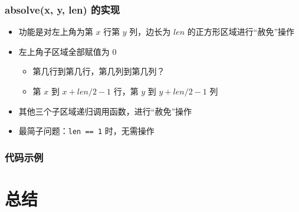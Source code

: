 \begin{frame}[fragile]
    \frametitle{absolve(x, y, len) 的实现}
    \begin{itemize}[<+->]
        \item 功能是对左上角为第 $x$ 行第 $y$ 列，边长为 $len$ 的正方形区域进行“赦免”操作
        \item 左上角子区域全部赋值为 $0$
        \begin{itemize}
            \item 第几行到第几行，第几列到第几列？
            \item 第 $x$ 到 $x + len / 2 - 1$ 行，第 $y$ 到 $y + len / 2 - 1$ 列
        \end{itemize}
        \item 其他三个子区域递归调用函数，进行“赦免”操作
        \item 最简子问题：\lstinline|len == 1| 时，无需操作
    \end{itemize}
\end{frame}

\begin{frame}[fragile]
    \frametitle{代码示例}
    

\end{frame}


\section{总结}

